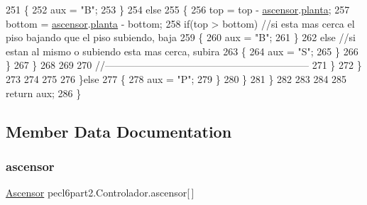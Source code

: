 \begin{DoxyCode}
251                         \{
252                             aux = \textcolor{stringliteral}{"B"};
253                         \}
254                         \textcolor{keywordflow}{else}
255                         \{
256                             top = top - \mbox{\hyperlink{classpecl6part2_1_1_controlador_ac2f7c4abd5447ea5daeeb7d62bf3f591}{ascensor}}.\mbox{\hyperlink{classpecl6part2_1_1_ascensor_a66017643cc6554b17d447867a0c0d619}{planta}};
257                             bottom = \mbox{\hyperlink{classpecl6part2_1_1_controlador_ac2f7c4abd5447ea5daeeb7d62bf3f591}{ascensor}}.\mbox{\hyperlink{classpecl6part2_1_1_ascensor_a66017643cc6554b17d447867a0c0d619}{planta}} - bottom;
258                             \textcolor{keywordflow}{if}(top > bottom) \textcolor{comment}{//si esta mas cerca el piso bajando que el piso subiendo, baja}
259                             \{
260                                 aux = \textcolor{stringliteral}{"B"};
261                             \}
262                             \textcolor{keywordflow}{else} \textcolor{comment}{//si estan al mismo o subiendo esta mas cerca, subira}
263                             \{
264                                 aux = \textcolor{stringliteral}{"S"};
265                             \}
266                         \}
267                     \}
268                     
269                     
270                   \textcolor{comment}{//--------------------------------------------------------------}
271                         \}
272                     \}
273                     
274                     
275                     
276                 \}\textcolor{keywordflow}{else}
277                 \{
278                     aux = \textcolor{stringliteral}{"P"};
279                 \}
280             \}
281         \}
282         
283         
284         
285         \textcolor{keywordflow}{return} aux;
286     \}
\end{DoxyCode}


\subsection{Member Data Documentation}
\mbox{\label{classpecl6part2_1_1_controlador_ac2f7c4abd5447ea5daeeb7d62bf3f591}} 
\subsubsection{\texorpdfstring{ascensor}{ascensor}}
{\footnotesize\ttfamily \mbox{\hyperlink{classpecl6part2_1_1_ascensor}{Ascensor}} pecl6part2.\+Controlador.\+ascensor\mbox{[}$\,$\mbox{]}\hspace{0.3cm}{\ttfamily [package]}}

